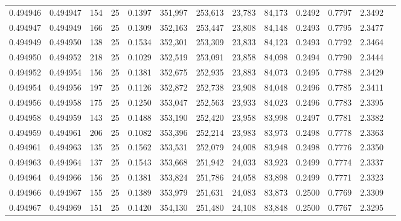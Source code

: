 \begin{tabular}{rrrrrrrrrrrrr}
0.494946 & 0.494947 &   154 &  25 &                                     0.1397 & 351,997 & 253,613 &  23,783 &  84,173 & 0.2492 & 0.7797 & 2.3492 \\
0.494947 & 0.494949 &   166 &  25 &                                     0.1309 & 352,163 & 253,447 &  23,808 &  84,148 & 0.2493 & 0.7795 & 2.3477 \\
0.494949 & 0.494950 &   138 &  25 &                                     0.1534 & 352,301 & 253,309 &  23,833 &  84,123 & 0.2493 & 0.7792 & 2.3464 \\
0.494950 & 0.494952 &   218 &  25 &                                     0.1029 & 352,519 & 253,091 &  23,858 &  84,098 & 0.2494 & 0.7790 & 2.3444 \\
0.494952 & 0.494954 &   156 &  25 &                                     0.1381 & 352,675 & 252,935 &  23,883 &  84,073 & 0.2495 & 0.7788 & 2.3429 \\
0.494954 & 0.494956 &   197 &  25 &                                     0.1126 & 352,872 & 252,738 &  23,908 &  84,048 & 0.2496 & 0.7785 & 2.3411 \\
0.494956 & 0.494958 &   175 &  25 &                                     0.1250 & 353,047 & 252,563 &  23,933 &  84,023 & 0.2496 & 0.7783 & 2.3395 \\
0.494958 & 0.494959 &   143 &  25 &                                     0.1488 & 353,190 & 252,420 &  23,958 &  83,998 & 0.2497 & 0.7781 & 2.3382 \\
0.494959 & 0.494961 &   206 &  25 &                                     0.1082 & 353,396 & 252,214 &  23,983 &  83,973 & 0.2498 & 0.7778 & 2.3363 \\
0.494961 & 0.494963 &   135 &  25 &                                     0.1562 & 353,531 & 252,079 &  24,008 &  83,948 & 0.2498 & 0.7776 & 2.3350 \\
0.494963 & 0.494964 &   137 &  25 &                                     0.1543 & 353,668 & 251,942 &  24,033 &  83,923 & 0.2499 & 0.7774 & 2.3337 \\
0.494964 & 0.494966 &   156 &  25 &                                     0.1381 & 353,824 & 251,786 &  24,058 &  83,898 & 0.2499 & 0.7771 & 2.3323 \\
0.494966 & 0.494967 &   155 &  25 &                                     0.1389 & 353,979 & 251,631 &  24,083 &  83,873 & 0.2500 & 0.7769 & 2.3309 \\
0.494967 & 0.494969 &   151 &  25 &                                     0.1420 & 354,130 & 251,480 &  24,108 &  83,848 & 0.2500 & 0.7767 & 2.3295 \\

\end{tabular}
